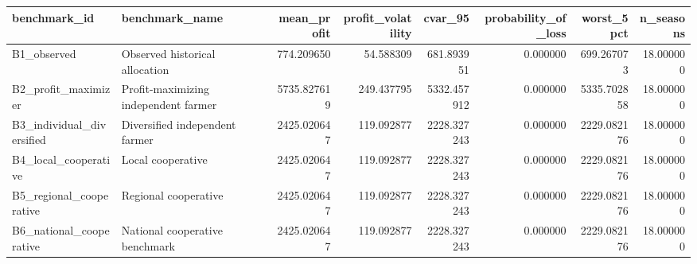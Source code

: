 \begin{tabular}{llrrrrrr}
\toprule
benchmark\_id & benchmark\_name & mean\_profit & profit\_volatility & cvar\_95 & probability\_of\_loss & worst\_5pct & n\_seasons \\
\midrule
B1\_observed & Observed historical allocation & 774.209650 & 54.588309 & 681.893951 & 0.000000 & 699.267073 & 18.000000 \\
B2\_profit\_maximizer & Profit-maximizing independent farmer & 5735.827619 & 249.437795 & 5332.457912 & 0.000000 & 5335.702858 & 18.000000 \\
B3\_individual\_diversified & Diversified independent farmer & 2425.020647 & 119.092877 & 2228.327243 & 0.000000 & 2229.082176 & 18.000000 \\
B4\_local\_cooperative & Local cooperative & 2425.020647 & 119.092877 & 2228.327243 & 0.000000 & 2229.082176 & 18.000000 \\
B5\_regional\_cooperative & Regional cooperative & 2425.020647 & 119.092877 & 2228.327243 & 0.000000 & 2229.082176 & 18.000000 \\
B6\_national\_cooperative & National cooperative benchmark & 2425.020647 & 119.092877 & 2228.327243 & 0.000000 & 2229.082176 & 18.000000 \\
\bottomrule
\end{tabular}
